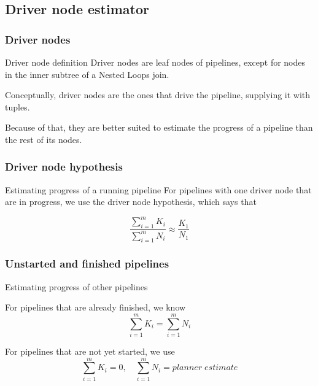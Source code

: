 \documentclass{beamer}
\begin{document}
\subsection{Driver node estimator}

\begin{frame}
  \frametitle{Driver nodes}

  \begin{block}{Driver node definition}
    Driver nodes are leaf nodes of pipelines, except for nodes in the inner
    subtree of a Nested Loops join.
  \end{block}

  \bigskip

  Conceptually, driver nodes are the ones that \alert{drive} the pipeline,
  supplying it with tuples.

  \bigskip

  Because of that, they are better suited to estimate the progress of a
  pipeline than the rest of its nodes.
\end{frame}

\begin{frame}
  \frametitle{Driver node hypothesis}

  \begin{block}{Estimating progress of a running pipeline}
    For pipelines with one driver node that are in progress, we use the
    \alert{driver node hypothesis}, which says that

    \bigskip

    \begin{equation*}
      \frac{\sum\limits_{i=1}^{m} K_{i}}{\sum\limits_{i=1}^{m} N_{i}} \approx \frac{K_{1}}{N_{1}}
    \end{equation*}
  \end{block}
\end{frame}

\begin{frame}
  \frametitle{Unstarted and finished pipelines}

  \begin{block}{Estimating progress of other pipelines}

    For pipelines that are already \alert{finished}, we know
    \begin{equation*}
      \sum\limits_{i=1}^{m} K_{i} = \sum\limits_{i=1}^{m} N_{i}
    \end{equation*}

    For pipelines that are \alert{not yet started}, we use
    \begin{equation*}
      \sum\limits_{i=1}^{m} K_{i} = 0 , \quad \sum\limits_{i=1}^{m} N_{i} = planner\;estimate
    \end{equation*}
  \end{block}
\end{frame}
\end{document}
